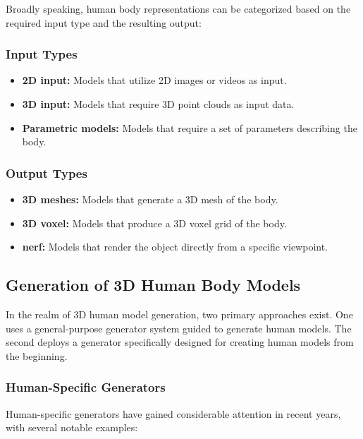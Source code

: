 Broadly speaking, human body representations can be categorized based on the
required input type and the resulting output:

\subsubsection{Input Types}

\begin{itemize}
	\item \textbf{2D input:} Models that utilize 2D images or videos as input.
	\item \textbf{3D input:} Models that require 3D point clouds as input data.
	\item \textbf{Parametric models:} Models that require a set of parameters describing the body.
\end{itemize}

\subsubsection{Output Types}

\begin{itemize}
	\item \textbf{3D meshes:} Models that generate a 3D mesh of the body.
	\item \textbf{3D voxel:} Models that produce a 3D voxel grid of the body.
	\item \textbf{\gls{nerf}:} Models that render the object directly from a specific viewpoint.
\end{itemize}

\subsection{Generation of 3D Human Body Models}

In the realm of 3D human model generation, two primary approaches exist. One
uses a general-purpose generator system guided to generate human models. The
second deploys a generator specifically designed for creating human models from
the beginning.

\subsubsection{Human-Specific Generators}

Human-specific generators have gained considerable attention in recent years,
with several notable examples:

